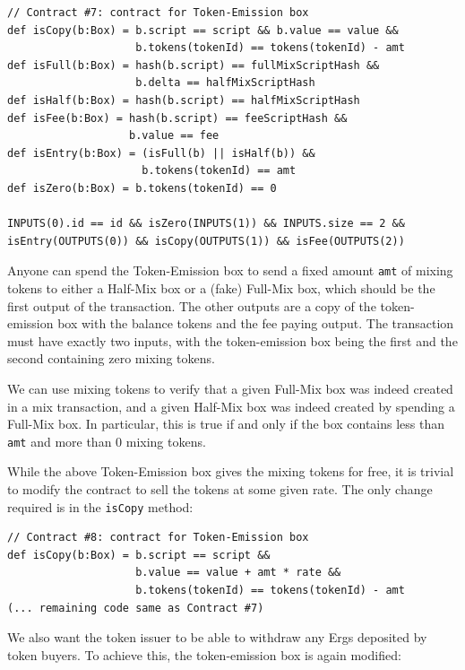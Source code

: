 \documentclass[runningheads]{llncs}
\begin{document}
{\small
\begin{Verbatim}[frame=single]
// Contract #7: contract for Token-Emission box
def isCopy(b:Box) = b.script == script && b.value == value &&
                    b.tokens(tokenId) == tokens(tokenId) - amt
def isFull(b:Box) = hash(b.script) == fullMixScriptHash && 
                    b.delta == halfMixScriptHash
def isHalf(b:Box) = hash(b.script) == halfMixScriptHash
def isFee(b:Box) = hash(b.script) == feeScriptHash &&
                   b.value == fee
def isEntry(b:Box) = (isFull(b) || isHalf(b)) && 
                     b.tokens(tokenId) == amt
def isZero(b:Box) = b.tokens(tokenId) == 0

INPUTS(0).id == id && isZero(INPUTS(1)) && INPUTS.size == 2 &&
isEntry(OUTPUTS(0)) && isCopy(OUTPUTS(1)) && isFee(OUTPUTS(2))
\end{Verbatim}
}

Anyone can spend the Token-Emission box to send a fixed amount \texttt{amt} of mixing tokens to either a Half-Mix box or a (fake) Full-Mix box, which should be the first output of the transaction. The other outputs are a copy of the token-emission box with the balance tokens and the fee paying output. The transaction must have exactly two inputs, with the token-emission box being the first and the second containing zero mixing tokens. 

We can use mixing tokens to verify that a given Full-Mix box was indeed created in a mix transaction, and a given Half-Mix box was indeed created by spending a Full-Mix box. In particular, this is true if and only if the box contains less than \texttt{amt} and more than 0 mixing tokens.  

While the above Token-Emission box gives the mixing tokens for free, it is trivial to modify the contract to sell the tokens at some given rate. The only change required is in the \texttt{isCopy} method:

{\small
\begin{Verbatim}[frame=single]
// Contract #8: contract for Token-Emission box
def isCopy(b:Box) = b.script == script && 
                    b.value == value + amt * rate &&
                    b.tokens(tokenId) == tokens(tokenId) - amt
(... remaining code same as Contract #7)
\end{Verbatim}
}

We also want the token issuer to be able to withdraw any Ergs deposited by token buyers. To achieve this, the token-emission box is again modified:
\end{document}
